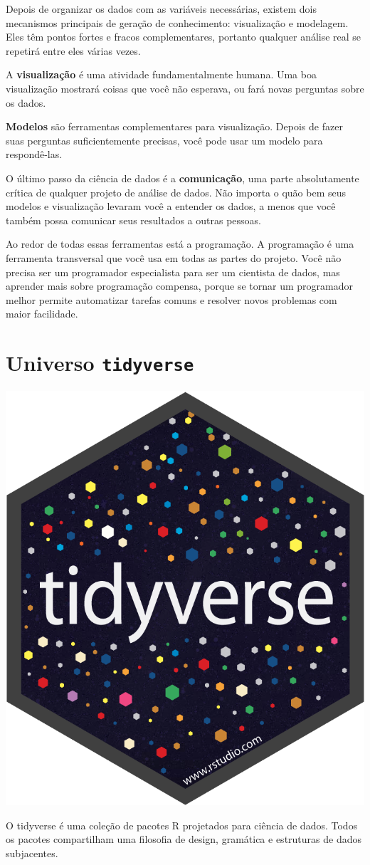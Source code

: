 \documentclass[]{book}
\begin{document}
Depois de organizar os dados com as variáveis necessárias, existem dois mecanismos principais de geração de conhecimento: visualização e modelagem. Eles têm pontos fortes e fracos complementares, portanto qualquer análise real se repetirá entre eles várias vezes.

A \textbf{visualização} é uma atividade fundamentalmente humana. Uma boa visualização mostrará coisas que você não esperava, ou fará novas perguntas sobre os dados.

\textbf{Modelos} são ferramentas complementares para visualização. Depois de fazer suas perguntas suficientemente precisas, você pode usar um modelo para respondê-las.

O último passo da ciência de dados é a \textbf{comunicação}, uma parte absolutamente crítica de qualquer projeto de análise de dados. Não importa o quão bem seus modelos e visualização levaram você a entender os dados, a menos que você também possa comunicar seus resultados a outras pessoas.

Ao redor de todas essas ferramentas está a programação. A programação é uma ferramenta transversal que você usa em todas as partes do projeto. Você não precisa ser um programador especialista para ser um cientista de dados, mas aprender mais sobre programação compensa, porque se tornar um programador melhor permite automatizar tarefas comuns e resolver novos problemas com maior facilidade.

\hypertarget{universo-tidyverse}{%
\section{\texorpdfstring{Universo \texttt{tidyverse}}{Universo tidyverse}}\label{universo-tidyverse}}

\begin{center}\includegraphics[width=0.25\linewidth]{imagens/hex-tidyverse} \end{center}

O tidyverse é uma coleção de pacotes R projetados para ciência de dados. Todos os pacotes compartilham uma filosofia de design, gramática e estruturas de dados subjacentes.
\end{document}
